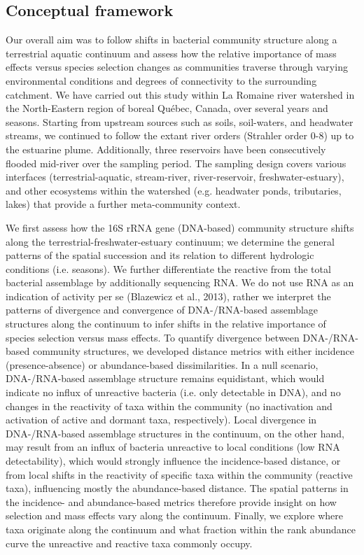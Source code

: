 \documentclass[12pt,a4paper]{article} %
\begin{document}
\subsection*{Conceptual framework}
Our overall aim was to follow shifts in bacterial community structure along a terrestrial aquatic continuum and assess how the relative importance of mass effects versus species selection changes as communities traverse through varying environmental conditions and degrees of connectivity to the surrounding catchment. We have carried out this study within La Romaine river watershed in the North-Eastern region of boreal Québec, Canada, over several years and seasons. Starting from upstream sources such as soils, soil-waters, and headwater streams, we continued to follow the extant river orders (Strahler order 0-8) up to the estuarine plume. Additionally, three reservoirs have been consecutively flooded mid-river over the sampling period. The sampling design covers various interfaces (terrestrial-aquatic, stream-river, river-reservoir, freshwater-estuary), and other ecosystems within the watershed (e.g. headwater ponds, tributaries, lakes) that provide a further meta-community context.

We first assess how the 16S rRNA gene (DNA-based) community structure shifts along the terrestrial-freshwater-estuary continuum; we determine the general patterns of the spatial succession and its relation to different hydrologic conditions (i.e. seasons). We further differentiate the reactive from the total bacterial assemblage by additionally sequencing RNA. We do not use RNA as an indication of activity per se (Blazewicz et al., 2013), rather we interpret the patterns of divergence and convergence of DNA-/RNA-based assemblage structures along the continuum to infer shifts in the relative importance of species selection versus mass effects. To quantify divergence between DNA-/RNA-based community structures, we developed distance metrics with either incidence (presence-absence) or abundance-based dissimilarities. In a null scenario, DNA-/RNA-based assemblage structure remains equidistant, which would indicate no influx of unreactive bacteria (i.e. only detectable in DNA), and no changes in the reactivity of taxa within the community (no inactivation and activation of active and dormant taxa, respectively). Local divergence in DNA-/RNA-based assemblage structures in the continuum, on the other hand, may result from an influx of bacteria unreactive to local conditions (low RNA detectability), which would strongly influence the incidence-based distance, or from local shifts in the reactivity of specific taxa within the community (reactive taxa), influencing mostly the abundance-based distance. The spatial patterns in the incidence- and abundance-based metrics therefore provide insight on how selection and mass effects vary along the continuum. Finally, we explore where taxa originate along the continuum and what fraction within the rank abundance curve the unreactive and reactive taxa commonly occupy.
\end{document}
